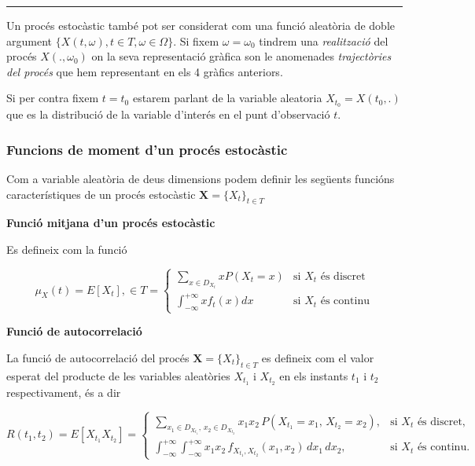 \documentclass[
  catalan,
]{article}
\theoremstyle{definition}
\theoremstyle{definition}
\theoremstyle{definition}
\theoremstyle{definition}
\theoremstyle{remark}
\begin{document}
\begin{center}\rule{0.5\linewidth}{0.5pt}\end{center}

Un procés estocàstic també pot ser considerat com una funció aleatòria de doble argument \(\{ X(t,\omega), t \in T , \omega \in \Omega\}\). Si fixem \(\omega=\omega_0\) tindrem una \emph{realització} del procés \(X(.,\omega_0)\) on la seva representació gràfica son le anomenades \emph{trajectòries del procés} que hem representant en els 4 gràfics anteriors.

Si per contra fixem \(t=t_0\) estarem parlant de la variable aleatoria \(X_{t_0}= X(t_0,.)\) que es la distribució de la variable d'interés en el punt d'observació \(t\).

\subsubsection{Funcions de moment d'un procés estocàstic}\label{funcions-de-moment-dun-procuxe9s-estocuxe0stic}

Com a variable aleatòria de deus dimensions podem definir les següents funcións característiques de un procés estocàstic \(\textbf{X}=\{X_t\}_{t \in T}\)

\textbf{Funció mitjana d'un procés estocàstic}

Es defineix com la funció

\[
\mu_X(t)= E[X_t], \in T=
\begin{cases}
\displaystyle
 \sum_{x \in D_{X_t}} x P(X_t=x)
& \text{si } X_t \text{ és discret} \\
\displaystyle
\int_{- \infty}^{+\infty} xf_t(x) dx  
& \text{si } X_t \text{ és continu}
\end{cases}   \label{eq:meanprocess}
\]

\textbf{Funció de autocorrelació}

La funció de autocorrelació del procés \(\textbf{X}=\{X_t\}_{t \in T}\) es defineix com el valor esperat del producte de les variables aleatòries \(X_{t_1}\) i \(X_{t_2}\) en els instants \(t_1\) i \(t_2\) respectivament, és a dir

\[
R(t_1,t_2)=E\!\left[X_{t_1}X_{t_2}\right]=
\begin{cases}
\displaystyle
\sum_{x_1\in D_{X_{t_1}},\,x_2\in D_{X_{t_2}}}
x_1x_2\,P(X_{t_1}=x_1,\,X_{t_2}=x_2),
& \text{si } X_t \text{ és discret},\\[3ex]
\displaystyle
\int_{-\infty}^{+\infty}
\int_{-\infty}^{+\infty}
x_1x_2\,f_{X_{t_1},X_{t_2}}(x_1,x_2)\,dx_1\,dx_2,
& \text{si } X_t \text{ és continu}.
\end{cases} \label{eq:acfprocess}
\]
\end{document}
